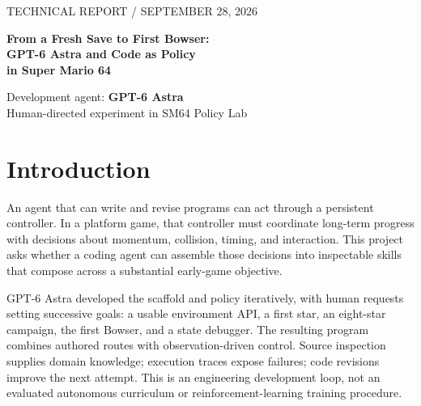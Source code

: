 \documentclass[10pt,letterpaper]{article}
\begin{document}
\thispagestyle{empty}
{\small\textcolor{accent}{TECHNICAL REPORT \quad / \quad SEPTEMBER 28, 2026}}
\vspace{0.3cm}

{\LARGE\bfseries\color{ink} From a Fresh Save to First Bowser:\\[3pt]
GPT-6 Astra and Code as Policy\\[3pt] in Super Mario 64\par}
\vspace{0.2cm}
{\large Development agent: \textbf{GPT-6 Astra}}\\
Human-directed experiment in SM64 Policy Lab

\begin{abstract}
\noindent We report an engineering case study in which GPT-6 Astra, acting as a coding agent under human task-level direction, develops a hierarchical executable policy for Super Mario 64. The policy starts on castle grounds with an empty save, collects eight unique stars, traverses Bowser in the Dark World, defeats the first Bowser, and obtains the basement key. It uses privileged structured observations, source-informed landmarks, and feedback controllers; the deployed policy makes no language-model calls and has no trained weights. A complete run reaches the key after 26,540 physics frames, equivalent to 14:44.67 at 30 frames/s, with zero recorded deaths. An instrumented rerun matches the initial observation and all 26,600 recorded action/observation pairs, including the post-success tail. We describe the environment contract, skill hierarchy, independent success check, and synchronized game/state debugger. This demonstrates a reproducible milestone within the tested setup, rather than a measured general success rate, vision-only gameplay, or completion of the full game.
\end{abstract}

\section{Introduction}
An agent that can write and revise programs can act through a persistent controller. In a platform game, that controller must coordinate long-term progress with decisions about momentum, collision, timing, and interaction. This project asks whether a coding agent can assemble those decisions into inspectable skills that compose across a substantial early-game objective.

GPT-6 Astra developed the scaffold and policy iteratively, with human requests setting successive goals: a usable environment API, a first star, an eight-star campaign, the first Bowser, and a state debugger. The resulting program combines authored routes with observation-driven control. Source inspection supplies domain knowledge; execution traces expose failures; code revisions improve the next attempt. This is an engineering development loop, not an evaluated autonomous curriculum or reinforcement-learning training procedure.
\end{document}
